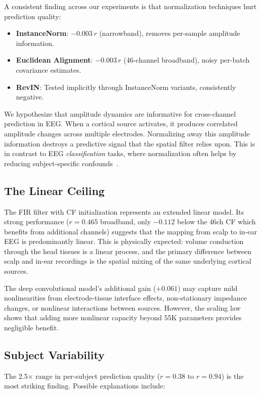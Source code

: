\documentclass[conference]{IEEEtran}
\begin{document}
A consistent finding across our experiments is that normalization techniques hurt prediction quality:

\begin{itemize}
    \item \textbf{InstanceNorm}: $-0.003\,r$ (narrowband), removes per-sample amplitude information.
    \item \textbf{Euclidean Alignment}: $-0.003\,r$ (46-channel broadband), noisy per-batch covariance estimates.
    \item \textbf{RevIN}: Tested implicitly through InstanceNorm variants, consistently negative.
\end{itemize}

We hypothesize that amplitude dynamics are informative for cross-channel prediction in EEG. When a cortical source activates, it produces correlated amplitude changes across multiple electrodes. Normalizing away this amplitude information destroys a predictive signal that the spatial filter relies upon. This is in contrast to EEG \emph{classification} tasks, where normalization often helps by reducing subject-specific confounds~\cite{reve}.

\subsection{The Linear Ceiling}

The FIR filter with CF initialization represents an extended linear model. Its strong performance ($r = 0.465$ broadband, only $-0.112$ below the 46ch CF which benefits from additional channels) suggests that the mapping from scalp to in-ear EEG is predominantly linear. This is physically expected: volume conduction through the head tissues is a linear process, and the primary difference between scalp and in-ear recordings is the spatial mixing of the same underlying cortical sources.

The deep convolutional model's additional gain ($+0.061$) may capture mild nonlinearities from electrode-tissue interface effects, non-stationary impedance changes, or nonlinear interactions between sources. However, the scaling law shows that adding more nonlinear capacity beyond 55K parameters provides negligible benefit.

\subsection{Subject Variability}

The 2.5$\times$ range in per-subject prediction quality ($r = 0.38$ to $r = 0.94$) is the most striking finding. Possible explanations include:
\end{document}
